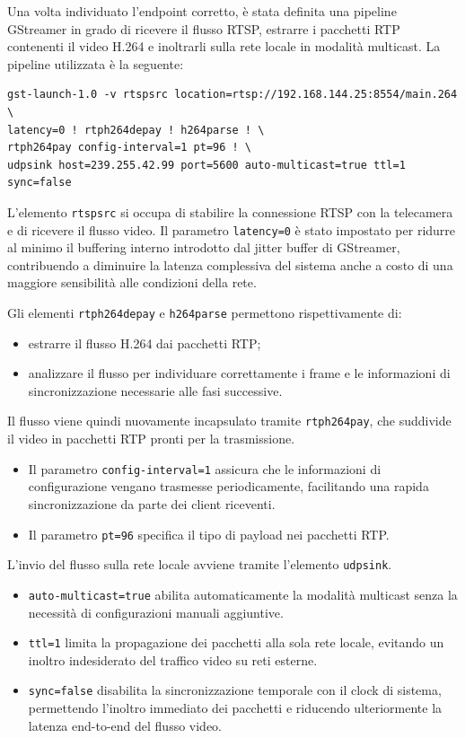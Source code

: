 Una volta individuato l’endpoint corretto, è stata definita una pipeline GStreamer in grado di ricevere il flusso RTSP, estrarre i pacchetti RTP contenenti il video H.264 e inoltrarli sulla rete locale in modalità multicast.
La pipeline utilizzata è la seguente:

\begin{verbatim}
gst-launch-1.0 -v rtspsrc location=rtsp://192.168.144.25:8554/main.264 \
latency=0 ! rtph264depay ! h264parse ! \
rtph264pay config-interval=1 pt=96 ! \
udpsink host=239.255.42.99 port=5600 auto-multicast=true ttl=1 sync=false
\end{verbatim}

L’elemento \texttt{rtspsrc} si occupa di stabilire la connessione RTSP con la telecamera e di ricevere il flusso video.  
Il parametro \texttt{latency=0} è stato impostato per ridurre al minimo il buffering interno introdotto dal jitter buffer di GStreamer, contribuendo a diminuire la latenza complessiva del sistema anche a costo di una maggiore sensibilità alle condizioni della rete.

Gli elementi \texttt{rtph264depay} e \texttt{h264parse} permettono rispettivamente di:  
\begin{itemize}
    \item estrarre il flusso H.264 dai pacchetti RTP;
    \item analizzare il flusso per individuare correttamente i frame e le informazioni di sincronizzazione necessarie alle fasi successive.
\end{itemize}

Il flusso viene quindi nuovamente incapsulato tramite \texttt{rtph264pay}, che suddivide il video in pacchetti RTP pronti per la trasmissione.  
\begin{itemize}
    \item Il parametro \texttt{config-interval=1} assicura che le informazioni di configurazione vengano trasmesse periodicamente, facilitando una rapida sincronizzazione da parte dei client riceventi.
    \item Il parametro \texttt{pt=96} specifica il tipo di payload nei pacchetti RTP.
\end{itemize}

L’invio del flusso sulla rete locale avviene tramite l’elemento \texttt{udpsink}.  
\begin{itemize}
    \item \texttt{auto-multicast=true} abilita automaticamente la modalità multicast senza la necessità di configurazioni manuali aggiuntive.
    \item \texttt{ttl=1} limita la propagazione dei pacchetti alla sola rete locale, evitando un inoltro indesiderato del traffico video su reti esterne.
    \item \texttt{sync=false} disabilita la sincronizzazione temporale con il clock di sistema, permettendo l’inoltro immediato dei pacchetti e riducendo ulteriormente la latenza end-to-end del flusso video.
\end{itemize}

